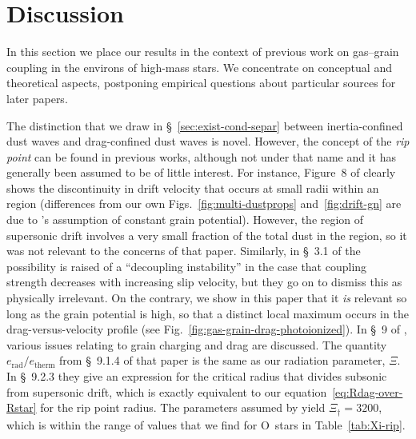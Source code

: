 
\section{Discussion}
\label{sec:discussion}

In this section we place our results in the context of previous work
on gas--grain coupling in the environs of high-mass stars.  We
concentrate on conceptual and theoretical aspects, postponing
empirical questions about particular sources for later papers.

The distinction that we draw in \S~\ref{sec:exist-cond-separ} between
inertia-confined dust waves and drag-confined dust waves is novel.
However, the concept of the \textit{rip point} can be found in
previous works, although not under that name and it has generally been
assumed to be of little interest.  For instance, Figure~8 of
\citet{Draine:2011a} clearly shows the discontinuity in drift velocity
that occurs at small radii within an \hii{} region (differences from
our own Figs.~\ref{fig:multi-dustprops} and~\ref{fig:drift-gn} are due
to \citeauthor{Draine:2011a}'s assumption of constant grain
potential).  However, the region of supersonic drift involves a very
small fraction of the total dust in the \hii{} region, so it was not
relevant to the concerns of that paper. Similarly, in \S~3.1 of
\citet{Hopkins:2018c} the possibility is raised of a ``decoupling
instability'' in the case that coupling strength decreases with
increasing slip velocity, but they go on to dismiss this as physically
irrelevant.  On the contrary, we show in this paper that it \emph{is}
relevant so long as the grain potential is high, so that a distinct
local maximum occurs in the drag-versus-velocity profile (see
Fig.~\ref{fig:gas-grain-drag-photoionized}).  In \S~9 of
\citet{Hopkins:2018a}, various issues relating to grain charging and
drag are discussed.  The quantity
\(e_{\text{rad}} / e_{\text{therm}}\) from \S~9.1.4 of that paper is
the same as our radiation parameter, \(\Xi\).  In \S~9.2.3 they give an
expression for the critical radius that divides subsonic from
supersonic drift, which is exactly equivalent to our
equation~\eqref{eq:Rdag-over-Rstar} for the rip point radius.  The
parameters assumed by \citeauthor{Hopkins:2018a} yield
\(\Xi_\dag = 3200\), which is within the range of values that we find for
O~stars in Table~\ref{tab:Xi-rip}.

